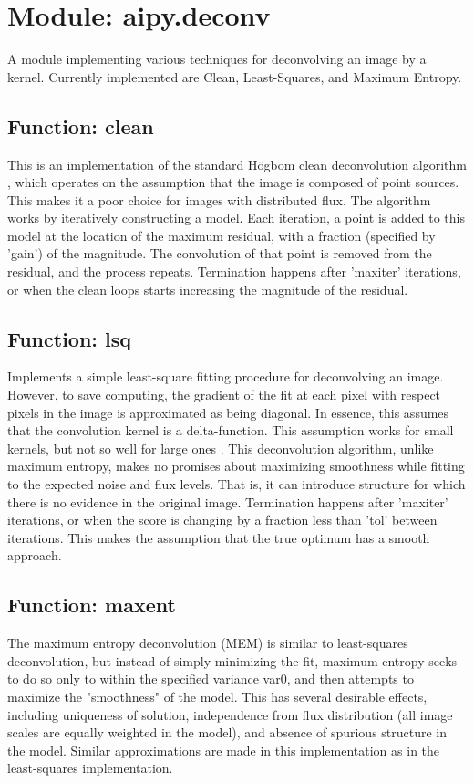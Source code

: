 \section{Module: aipy.deconv}

A module implementing various techniques for deconvolving an image by a
kernel.  Currently implemented are Clean, Least-Squares, and Maximum Entropy.

\subsection{Function: clean}

This is an implementation of the standard H{\"o}gbom clean deconvolution
algorithm \cite{hogbom1974}, which operates on the assumption that the image
is composed of point sources.  This makes it a poor choice for images with
distributed flux.  The algorithm works by iteratively constructing a model.
Each iteration, a point is added to this model at the location of the maximum
residual, with a fraction (specified by 'gain') of the magnitude.  The
convolution of that point is removed from the residual, and the process
repeats.  Termination happens after 'maxiter' iterations, or when the clean
loops starts increasing the magnitude of the residual.

\subsection{Function: lsq}

Implements a simple least-square fitting procedure for deconvolving an image.
However, to save computing, the gradient of the fit at each pixel with respect
pixels in the image is approximated as being diagonal.  In essence, this
assumes that the convolution kernel is a delta-function.  This assumption
works for small kernels, but not so well for large ones
\cite{cornwell_evans1985}.  This deconvolution algorithm, unlike maximum
entropy, makes no promises about maximizing smoothness while fitting to the
expected noise and flux levels.  That is, it can introduce structure for which
there is no evidence in the original image.  Termination happens after
'maxiter' iterations, or when the score is changing by a fraction less than
'tol' between iterations.  This makes the assumption that the true optimum has
a smooth approach.

\subsection{Function: maxent}

The maximum entropy deconvolution (MEM) \cite{cornwell_evans1985,sault1990} is
similar to least-squares deconvolution, but instead of simply minimizing the
fit, maximum entropy seeks to do so only to within the specified variance
var0, and then attempts to maximize the "smoothness" of the model.  This has
several desirable effects, including uniqueness of solution, independence from
flux distribution (all image scales are equally weighted in the model), and
absence of spurious structure in the model.  Similar approximations are made
in this implementation as in the least-squares implementation.

